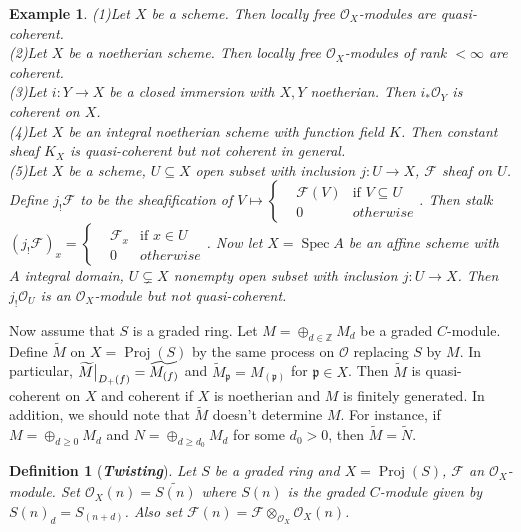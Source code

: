 \documentclass{ctexart}
\newtheorem{definition}{Definition}[section]
\newtheorem{example}{Example}[section]
\newcommand{\spec}{\operatorname{Spec}}
\newcommand{\proj}{\operatorname{Proj}}
\begin{document}
\begin{example}
    (1)Let $X$ be a scheme.
    Then locally free $\mathcal{O}_{X}$-modules are quasi-coherent. \\
    (2)Let $X$ be a noetherian scheme.
    Then locally free $\mathcal{O}_{X}$-modules of rank $< \infty$ are coherent. \\
    (3)Let $i: Y \longrightarrow X$ be a closed immersion with $X,Y$ noetherian.
    Then $i_{\ast}\mathcal{O}_{Y}$ is coherent on $X$. \\
    (4)Let $X$ be an integral noetherian scheme with function field $K$.
    Then constant sheaf $K_{X}$ is quasi-coherent but not coherent in general. \\
    (5)Let $X$ be a scheme, $U \subseteq X$ open subset with inclusion $j: U \longrightarrow X$, $\mathcal{F}$ sheaf on $U$.
    Define $j_{!}\mathcal{F}$ to be the sheafification of $V \longmapsto
    \left\{
        \begin{aligned}
            & \mathcal{F}(V) & \text{if } V \subseteq U \\
            & 0 & otherwise
        \end{aligned}
    \right.
    $.
    Then stalk $(j_{!}\mathcal{F})_{x} =
    \left\{
        \begin{aligned}
            & \mathcal{F}_{x} & \text{if } x\in U \\
            & 0 & otherwise
        \end{aligned}
    \right.
    $.
    Now let $X = \spec A$ be an affine scheme with $A$ integral domain, $U \subsetneq X$ nonempty open subset with inclusion $j: U \longrightarrow X$.
    Then $j_{!}\mathcal{O}_{U}$ is an $\mathcal{O}_{X}$-module but not quasi-coherent.
\end{example}
Now assume that $S$ is a graded ring.
Let $M = \oplus_{d\in \mathbb{Z}} M_{d}$ be a graded $C$-module.
Define $\widetilde{M}$ on $X = \proj(S)$ by the same process on $\mathcal{O}$ replacing $S$ by $M$.
In particular, $\widetilde{M}\big{|}_{D_{+}(f)} = \widetilde{M_{(f)}}$ and $\widetilde{M}_{\mathfrak{p}} = M_{(\mathfrak{p})}$ for $\mathfrak{p}\in X$.
Then $\widetilde{M}$ is quasi-coherent on $X$ and coherent if $X$ is noetherian and $M$ is finitely generated.
In addition, we should note that $\widetilde{M}$ doesn't determine $M$.
For instance, if $M = \oplus_{d \ge 0} M_{d}$ and $N = \oplus_{d \ge d_{0}} M_{d}$ for some $d_{0} > 0$, then $\widetilde{M} = \widetilde{N}$.
\begin{definition}[\textbf{\emph{Twisting}}]
    Let $S$ be a graded ring and $X = \proj(S)$, $\mathcal{F}$ an $\mathcal{O}_{X}$-module.
    Set $\mathcal{O}_{X}(n) = \widetilde{S(n)}$ where $S(n)$ is the graded $C$-module given by $S(n)_{d} = S_(n + d)$.
    Also set $\mathcal{F}(n) = \mathcal{F} \otimes_{\mathcal{O}_{X}} \mathcal{O}_{X}(n)$.
\end{definition}
\end{document}
